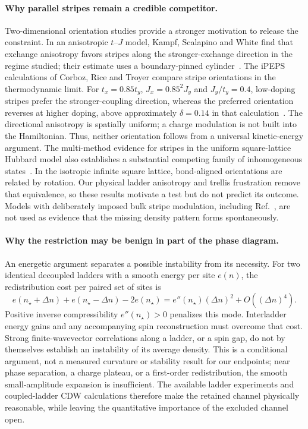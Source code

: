 \documentclass[11pt,letterpaper]{article}
\begin{document}
\paragraph{Why parallel stripes remain a credible competitor.}
Two-dimensional orientation studies provide a stronger motivation to release
the constraint. In an anisotropic $t$--$J$ model, Kampf, Scalapino and White
find that exchange anisotropy favors stripes along the stronger-exchange
direction in the regime studied; their estimate uses a boundary-pinned
cylinder~\citep{Kampf2001}. The iPEPS calculations of Corboz, Rice and Troyer
compare stripe orientations in the thermodynamic limit. For
$t_x=0.85t_y$, $J_x=0.85^2J_y$ and $J_y/t_y=0.4$, low-doping stripes prefer
the stronger-coupling direction, whereas the preferred orientation reverses
at higher doping, above approximately $\delta=0.14$ in that
calculation~\citep{Corboz2014}. The directional anisotropy is spatially
uniform; a charge modulation is not built into the Hamiltonian.
Thus, neither orientation follows from a universal kinetic-energy argument.
The multi-method evidence for stripes in the uniform square-lattice Hubbard
model also establishes a substantial competing family of inhomogeneous
states~\citep{Zheng2017}. In the isotropic infinite square lattice,
bond-aligned orientations are related by rotation. Our physical ladder
anisotropy and trellis frustration remove that equivalence, so these results
motivate a test but do not predict its outcome. Models with deliberately
imposed bulk stripe modulation, including Ref.~\citep{JiangKivelson2022},
are not used as evidence that the missing density pattern forms spontaneously.

\paragraph{Why the restriction may be benign in part of the phase diagram.}
An energetic argument separates a possible instability from its necessity.
For two identical decoupled ladders with a smooth energy per site $e(n)$,
the redistribution cost per paired set of sites is
\begin{equation}
 e(n_\star+\Delta n)+e(n_\star-\Delta n)-2e(n_\star)
 =e''(n_\star)(\Delta n)^2+O((\Delta n)^4).
 \label{eq:ladder-redistribution-cost}
\end{equation}
Positive inverse compressibility $e''(n_\star)>0$ penalizes this mode.
Interladder energy gains and any accompanying spin reconstruction must
overcome that cost. Strong finite-wavevector correlations along a ladder,
or a spin gap, do not by themselves establish an instability of its average
density. This is a conditional argument, not a measured curvature or
stability result for our endpoints; near phase separation, a charge plateau,
or a first-order redistribution, the smooth small-amplitude expansion is
insufficient. The available ladder experiments and coupled-ladder CDW
calculations therefore make the retained channel physically reasonable,
while leaving the quantitative importance of the excluded channel open.
\end{document}
